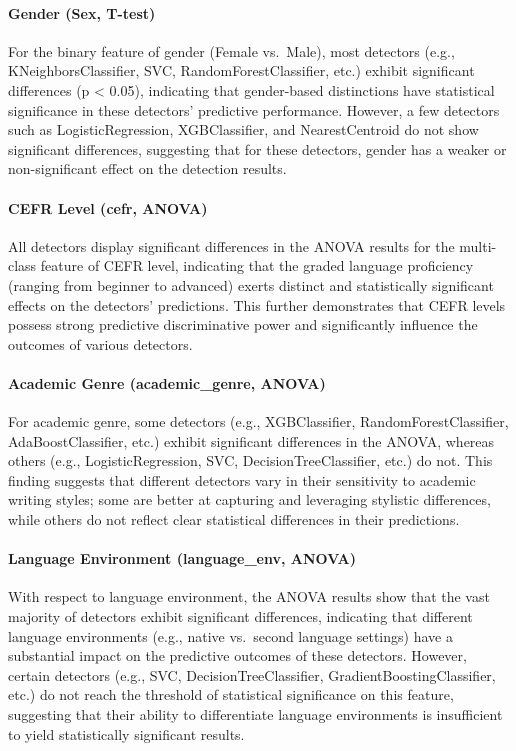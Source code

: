 \paragraph{Gender (Sex, T-test)} 
For the binary feature of gender (Female vs.\ Male), most detectors (e.g., KNeighborsClassifier, SVC, RandomForestClassifier, etc.) exhibit significant differences (p < 0.05), indicating that gender-based distinctions have statistical significance in these detectors’ predictive performance. However, a few detectors such as LogisticRegression, XGBClassifier, and NearestCentroid do not show significant differences, suggesting that for these detectors, gender has a weaker or non-significant effect on the detection results.

\paragraph{CEFR Level (cefr, ANOVA)} 
All detectors display significant differences in the ANOVA results for the multi-class feature of CEFR level, indicating that the graded language proficiency (ranging from beginner to advanced) exerts distinct and statistically significant effects on the detectors’ predictions. This further demonstrates that CEFR levels possess strong predictive discriminative power and significantly influence the outcomes of various detectors.

\paragraph{Academic Genre (academic\_genre, ANOVA)} 
For academic genre, some detectors (e.g., XGBClassifier, RandomForestClassifier, AdaBoostClassifier, etc.) exhibit significant differences in the ANOVA, whereas others (e.g., LogisticRegression, SVC, DecisionTreeClassifier, etc.) do not. This finding suggests that different detectors vary in their sensitivity to academic writing styles; some are better at capturing and leveraging stylistic differences, while others do not reflect clear statistical differences in their predictions.

\paragraph{Language Environment (language\_env, ANOVA)} 
With respect to language environment, the ANOVA results show that the vast majority of detectors exhibit significant differences, indicating that different language environments (e.g., native vs.\ second language settings) have a substantial impact on the predictive outcomes of these detectors. However, certain detectors (e.g., SVC, DecisionTreeClassifier, GradientBoostingClassifier, etc.) do not reach the threshold of statistical significance on this feature, suggesting that their ability to differentiate language environments is insufficient to yield statistically significant results.

